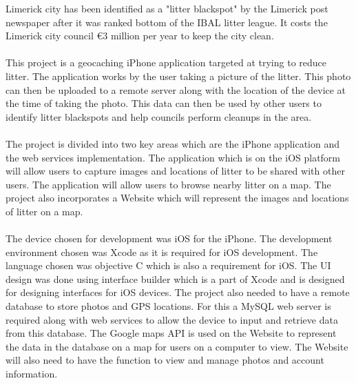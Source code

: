 \documentclass[12pt]{article}
\begin{document}
Limerick city has been identified as a "litter blackspot" by the Limerick post newspaper after it was ranked bottom of the IBAL litter league.
It costs the Limerick city council €3 million per year to keep the city clean. 

\paragraph{}
\label{par:First Paragraph}

This project is a geocaching iPhone application targeted at trying to reduce litter. The application works by the user taking a picture of the litter.
This photo can then be uploaded to a remote server along with the location of the device at the time of taking the photo. This data can then be used by other users to identify litter blackspots and help councils perform cleanups in the area.

\paragraph{}
\label{par:Second Paragraph}

The project is divided into two key areas which are the iPhone application and the web services implementation. The application which is on the iOS platform will allow users to capture images and locations of litter to be shared with other users. The application will allow users to browse nearby litter on a map.
The project also incorporates a Website which will represent the images and locations of litter on a map.
\paragraph{}
\label{par:Third Paragraph}

The device chosen for development was iOS for the iPhone. The development environment chosen was Xcode as it is required for iOS development. The language chosen was objective C which is also a requirement for iOS. 
The UI design was done using interface builder which is a part of Xcode and is designed for designing interfaces for iOS devices.
The project also needed to have a remote database to store photos and GPS locations. For this a MySQL web server is required along with web services to allow the device to input and retrieve data from this database. The Google maps API is used on the Website to represent the data in the database on a map for users on a computer to view.
The Website will also need to have the function to view and manage photos and account information.
\end{document}

